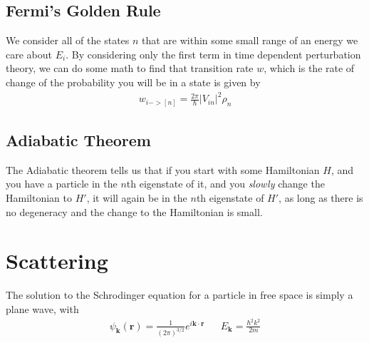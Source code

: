 \subsection{Fermi's Golden Rule}
We consider all of the states $n$ that are within some small range of an energy we care about $E_i$. By considering only the first term in time dependent perturbation theory, we can do some math to find that transition rate $w$, which is the rate of change of the probability you will be in a state is given by
\begin{align}
    w_{i->[n]} = \frac{2\pi}{\hbar} |V_{in}|^2\rho_n
\end{align}


\subsection{Adiabatic Theorem}
The Adiabatic theorem tells us that if you start with some Hamiltonian $H$, and you have a particle in the $n$th eigenstate of it, and you \emph{slowly} change the Hamiltonian to $H'$, it will again be in the $n$th eigenstate of $H'$, as long as there is no degeneracy and the change to the Hamiltonian is small.


\section{Scattering}

The solution to the Schrodinger equation for a particle in free space is simply a plane wave, with \cite{blugel}
\begin{align}
\psi_\textbf{k}(\textbf{r}) = \frac{1}{(2\pi)^{3/2}}e^{i\textbf{k}\cdot\textbf{r}}&& E_\textbf{k} = \frac{\hbar^2k^2}{2m}
\end{align}

